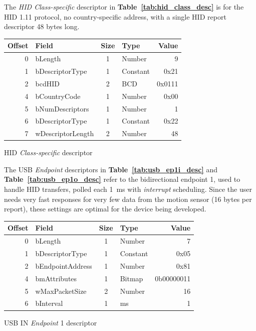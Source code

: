 \documentclass[a4paper,10pt]{article}
\makeatletter
\newenvironment{tablehere}{\def\@captype{table}\vspace{2ex}}{\vspace{2ex}}
\newcommand{\citet}[1]{\textbf{Table~\ref{#1}}}
\makeatother
\begin{document}
\begin{multicols}{2}
The \emph{HID Class-specific} descriptor in \citet{tab:hid_class_desc} is for
the HID 1.11 protocol, no country-specific address, with a single HID report
descriptor 48 bytes long.

\begin{tablehere}
\centering \footnotesize
\begin{tabular}{|r|l|c|l|r|}
\hline
\textbf{Offset} & \textbf{Field} & \textbf{Size} & \textbf{Type} & \textbf{Value}	\\
\hline
0	& bLength				& 1	& Number	& 9			\\
1	& bDescriptorType		& 1	& Constant	& 0x21		\\
2	& bcdHID				& 2	& BCD		& 0x0111	\\
4	& bCountryCode			& 1	& Number	& 0x00		\\
5	& bNumDescriptors		& 1	& Number	& 1			\\
6	& bDescriptorType		& 1	& Constant	& 0x22		\\
7	& wDescriptorLength		& 2	& Number	& 48		\\
\hline
\end{tabular}
\caption{HID \emph{Class-specific} descriptor}
\label{tab:hid_class_desc}
\end{tablehere}

The USB \emph{Endpoint} descriptors in \citet{tab:usb_ep1i_desc} and
\citet{tab:usb_ep1o_desc} refer to the bidirectional endpoint 1, used to
handle HID transfers, polled each 1~ms with \emph{interrupt} scheduling.
Since the user needs very fast responses for very few data from the motion
sensor (16 bytes per report), these settings are optimal for the device
being developed.

\begin{tablehere}
\centering \footnotesize
\begin{tabular}{|r|l|c|l|r|}
\hline
\textbf{Offset} & \textbf{Field} & \textbf{Size} & \textbf{Type} & \textbf{Value}	\\
\hline
0	& bLength				& 1	& Number	& 7				\\
1	& bDescriptorType		& 1	& Constant	& 0x05			\\
2	& bEndpointAddress		& 1	& Number	& 0x81			\\
4	& bmAttributes			& 1	& Bitmap	& 0b00000011	\\
5	& wMaxPacketSize		& 2	& Number	& 16			\\
6	& bInterval				& 1	& ms		& 1				\\
\hline
\end{tabular}
\caption{USB IN \emph{Endpoint} 1 descriptor}
\label{tab:usb_ep1i_desc}
\end{tablehere}


\end{multicols}
\end{document}
